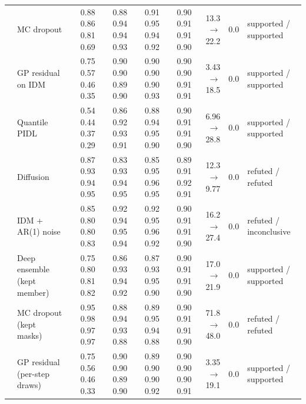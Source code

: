 \begin{table}[htbp]
\begin{tabular}{llrrrrrrl}
 & MC dropout & 0.88 0.86 0.81 0.69 & 0.88 0.94 0.94 0.93 & 0.91 0.95 0.94 0.92 & 0.90 0.91 0.91 0.90 & 13.3 $\rightarrow$ 22.2 & 0.0 & supported / supported \\
 & GP residual on IDM & 0.75 0.57 0.46 0.35 & 0.90 0.90 0.89 0.90 & 0.90 0.90 0.90 0.93 & 0.90 0.90 0.91 0.91 & 3.43 $\rightarrow$ 18.5 & 0.0 & supported / supported \\
 & Quantile PIDL & 0.54 0.44 0.37 0.29 & 0.86 0.92 0.93 0.91 & 0.88 0.94 0.95 0.90 & 0.90 0.91 0.91 0.90 & 6.96 $\rightarrow$ 28.8 & 0.0 & supported / supported \\
 & Diffusion & 0.87 0.93 0.94 0.95 & 0.83 0.93 0.94 0.95 & 0.85 0.95 0.96 0.95 & 0.89 0.91 0.92 0.91 & 12.3 $\rightarrow$ 9.77 & 0.0 & refuted / refuted \\
 & IDM + AR(1) noise & 0.85 0.80 0.80 0.83 & 0.92 0.94 0.95 0.94 & 0.92 0.95 0.96 0.92 & 0.90 0.91 0.91 0.90 & 16.2 $\rightarrow$ 27.4 & 0.0 & refuted / inconclusive \\
 & Deep ensemble (kept member) & 0.75 0.80 0.81 0.82 & 0.86 0.93 0.94 0.92 & 0.87 0.93 0.95 0.90 & 0.90 0.91 0.91 0.90 & 17.0 $\rightarrow$ 21.9 & 0.0 & supported / supported \\
 & MC dropout (kept masks) & 0.95 0.98 0.97 0.97 & 0.88 0.94 0.93 0.88 & 0.89 0.95 0.94 0.88 & 0.90 0.91 0.91 0.90 & 71.8 $\rightarrow$ 48.0 & 0.0 & refuted / refuted \\
 & GP residual (per-step draws) & 0.75 0.56 0.46 0.33 & 0.90 0.90 0.89 0.90 & 0.89 0.90 0.90 0.92 & 0.90 0.90 0.90 0.91 & 3.35 $\rightarrow$ 19.1 & 0.0 & supported / supported \\
\bottomrule
\end{tabular}
\end{table}
